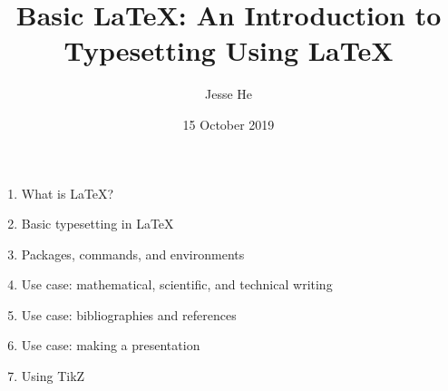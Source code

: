 \documentclass{article}
\title{Basic \LaTeX: An Introduction to Typesetting Using \LaTeX}
\author{Jesse He}
\date{15 October 2019}
\begin{document}
\maketitle

\begin{enumerate}
    \item What is \LaTeX?
    \item Basic typesetting in \LaTeX
    \item Packages, commands, and environments
    \item Use case: mathematical, scientific, and technical writing
    \item Use case: bibliographies and references
    \item Use case: making a presentation
    \item Using TikZ
\end{enumerate}
\end{document}
